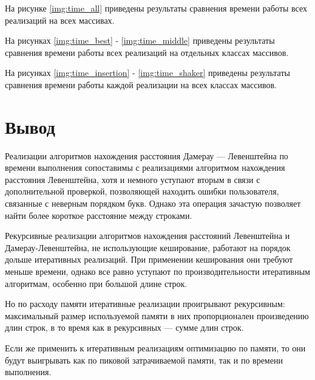  
На рисунке \ref{img:time_all} приведены результаты сравнения времени работы всех реализаций на всех массивах. 




На рисунках \ref{img:time_best} - \ref{img:time_middle} приведены результаты сравнения времени работы всех реализаций на отдельных классах массивов.






На рисунках \ref{img:time_insertion} - \ref{img:time_shaker} приведены результаты сравнения времени работы каждой реализации на всех классах массивов.





\section*{Вывод}

Реализации алгоритмов нахождения расстояния Дамерау — Левенштейна по времени выполнения сопоставимы с реализациями алгоритмом нахождения расстояния Левенштейна, хотя и немного уступают вторым в связи с дополнительной проверкой, позволяющей находить ошибки пользователя, связанные с неверным порядком букв. Однако эта операция зачастую позволяет найти более короткое расстояние между строками.

Рекурсивные реализации алгоритмов нахождения расстояний Левенштейна и Дамерау-Левенштейна, не использующие кеширование, работают на порядок дольше итеративных реализаций. При применении кеширования они требуют меньше времени, однако все равно уступают по производительности итеративным алгоритмам, особенно при большой длине строк. 

Но по расходу памяти итеративные реализации проигрывают рекурсивным: максимальный размер используемой памяти в них пропорционален произведению длин строк, в то время как в рекурсивных — сумме длин строк.

Если же применить к итеративным реализациям оптимизацию по памяти, то они будут выигрывать как по пиковой затрачиваемой памяти, так и по времени выполнения.
